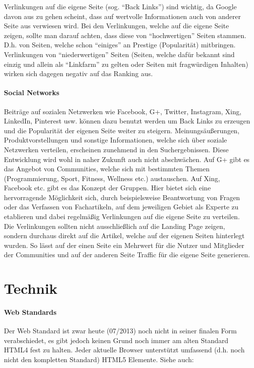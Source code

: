 \documentclass[ngerman, 12pt, a4paper]{scrartcl}
\begin{document}
Verlinkungen auf die eigene Seite (sog. ``Back Links'') sind wichtig, da Google davon aus zu gehen
scheint, dass auf wertvolle Informationen auch von anderer Seite aus verwiesen wird. Bei den
Verlinkungen, welche auf die eigene Seite zeigen, sollte man darauf achten, dass diese von
``hochwertigen'' Seiten stammen. D.h. von Seiten, welche schon ``einiges'' an Prestige (Popularität)
mitbringen. Verlinkungen von ``niederwertigen'' Seiten (Seiten, welche dafür bekannt sind einzig und
allein als ``Linkfarm'' \cite{link_farm} zu gelten oder Seiten mit fragwürdigen Inhalten) wirken
sich dagegen negativ auf das Ranking aus.

\paragraph*{Social Networks}
Beiträge auf sozialen Netzwerken wie Facebook, G+, Twitter, Instagram, Xing, LinkedIn, Pinterest usw.
können dazu benutzt werden um Back Links zu erzeugen und die Popularität der eigenen Seite weiter
zu steigern. Meinungsäußerungen, Produktvorstellungen und sonstige Informationen, welche sich über
soziale Netzwerken verteilen, erscheinen zunehmend in den Suchergebnissen. Diese Entwicklung wird
wohl in naher Zukunft auch nicht abschwächen. Auf G+ gibt es das Angebot von Communities, welche
sich mit bestimmten Themen (Programmierung, Sport, Fitness, Wellness etc.) austauschen. Auf Xing,
Facebook etc. gibt es das Konzept der Gruppen. Hier bietet sich eine hervorragende Möglichkeit sich,
durch beispielsweise Beantwortung von Fragen oder das Verfassen von Fachartikeln, auf dem jeweiligen
Gebiet als Experte zu etablieren und dabei regelmäßig Verlinkungen auf die eigene Seite zu verteilen.
Die Verlinkungen sollten nicht ausschließlich auf die Landing Page zeigen, sondern durchaus direkt
auf die Artikel, welche auf der eigenen Seiten hinterlegt wurden. So lässt auf der einen Seite ein
Mehrwert für die Nutzer und Mitglieder der Communities und auf der anderen Seite Traffic für die
eigene Seite generieren.


\section*{Technik}
\paragraph*{Web Standards}
Der Web Standard ist zwar heute (07/2013) noch nicht in seiner finalen Form verabschiedet, es gibt
jedoch keinen Grund noch immer am alten Standard HTML4 fest zu halten. Jeder aktuelle Browser
unterstützt umfassend (d.h. noch nicht den kompletten Standard) HTML5 Elemente. Siehe auch: \cite{html5}
\end{document}
